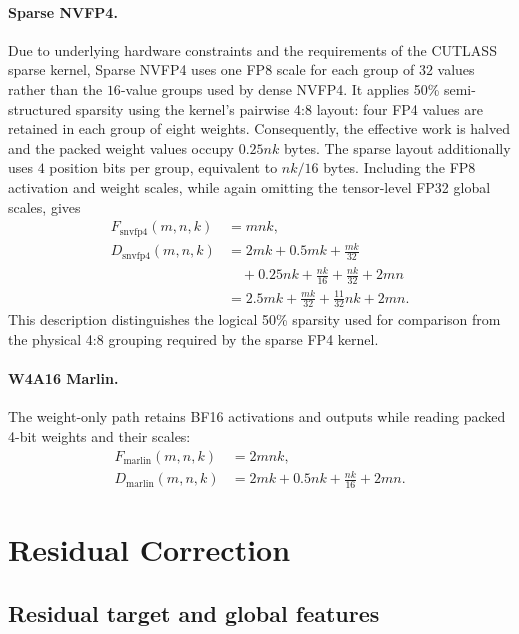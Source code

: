 \documentclass[letterpaper]{article} %
\numberwithin{equation}{section}
\numberwithin{table}{section}
\begin{document}
\paragraph{Sparse NVFP4.}
Due to underlying hardware constraints and the requirements of the CUTLASS
sparse kernel, Sparse NVFP4 uses one FP8 scale for each group of \(32\)
values rather than the \(16\)-value groups used by dense NVFP4. It applies
50\% semi-structured sparsity using the kernel's pairwise 4:8 layout: four FP4
values are retained in each group of eight weights. Consequently, the
effective work is halved and the packed weight values occupy \(0.25nk\)
bytes. The sparse layout additionally uses \(4\) position bits per group,
equivalent to \(nk/16\) bytes. Including the FP8 activation and weight scales,
while again omitting the tensor-level FP32 global scales, gives
\begin{equation}
\begin{aligned}
F_{\mathrm{snvfp4}}(m,n,k) &= mnk,\\
D_{\mathrm{snvfp4}}(m,n,k)
&=2mk+0.5mk+\frac{mk}{32}\\
&\quad+0.25nk+\frac{nk}{16}+\frac{nk}{32}+2mn\\
&=2.5mk+\frac{mk}{32}+\frac{11}{32}nk+2mn.
\end{aligned}
\end{equation}
This description distinguishes the logical 50\% sparsity used for comparison
from the physical 4:8 grouping required by the sparse FP4 kernel.

\paragraph{W4A16 Marlin.}
The weight-only path retains BF16 activations and outputs while reading packed
4-bit weights and their scales:
\begin{equation}
\begin{aligned}
F_{\mathrm{marlin}}(m,n,k) &= 2mnk,\\
D_{\mathrm{marlin}}(m,n,k)
&=2mk+0.5nk+\frac{nk}{16}+2mn.
\end{aligned}
\end{equation}

\section{Residual Correction}
\label{app:latency-residual}

\subsection{Residual target and global features}
\end{document}
